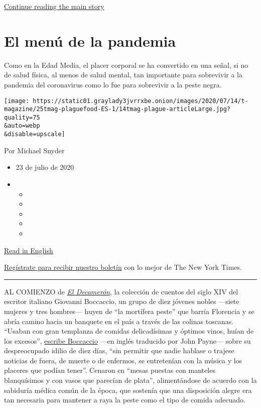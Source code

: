 \protect\hyperlink{after-sponsor}{Continue reading the main story}

\hypertarget{el-menuxfa-de-la-pandemia}{%
\section{El menú de la pandemia}\label{el-menuxfa-de-la-pandemia}}

Como en la Edad Media, el placer corporal se ha convertido en una señal,
si no de salud física, al menos de salud mental, tan importante para
sobrevivir a la pandemia del coronavirus como lo fue para sobrevivir a
la peste negra.

\texttt{[image: https://static01.graylady3jvrrxbe.onion/images/2020/07/14/t-magazine/25tmag-plaguefood-ES-1/14tmag-plague-articleLarge.jpg?quality=75\\\&auto=webp\\\&disable=upscale]}

Por Michael Snyder

\begin{itemize}
\item
  23 de julio de 2020
\item
  \begin{itemize}
  \item
  \item
  \item
  \item
  \item
  \end{itemize}
\end{itemize}

\href{https://www.nytimes3xbfgragh.onion/2020/07/16/t-magazine/eating-food-during-plague.html}{Read
in English}

\href{https://www.nytimes3xbfgragh.onion/newsletters/el-times}{Regístrate
para recibir nuestro boletín} con lo mejor de The New York Times.

\begin{center}\rule{0.5\linewidth}{\linethickness}\end{center}

AL COMIENZO de
\href{https://www.nytimes3xbfgragh.onion/interactive/2020/07/07/magazine/decameron-project-short-story-collection.html}{\emph{El
Decamerón}}, la colección de cuentos del siglo XIV del escritor italiano
Giovanni Boccaccio, un grupo de diez jóvenes nobles ---siete mujeres y
tres hombres--- huyen de ``la mortífera peste'' que barría Florencia y
se abría camino hacia un banquete en el país a través de las colinas
toscanas. ``Usaban con gran templanza de comidas delicadísimas y óptimos
vinos, huían de los excesos'',
\href{https://www.alianzaeditorial.es/primer_capitulo/decameron.pdf}{escribe
Boccaccio} ---en inglés traducido por John Payne--- sobre su
despreocupado idilio de diez días, ``sin permitir que nadie hablase o
trajese noticias de fuera, de muerte o de enfermos, se entretenían con
la música y los placeres que podían tener''. Cenaron en ``mesas puestas
con manteles blanquísimos y con vasos que parecían de plata'',
alimentándose de acuerdo con la sabiduría médica común de la época, que
sostenía que una disposición alegre era tan necesaria para mantener a
raya la peste como el tipo de comida adecuado.

